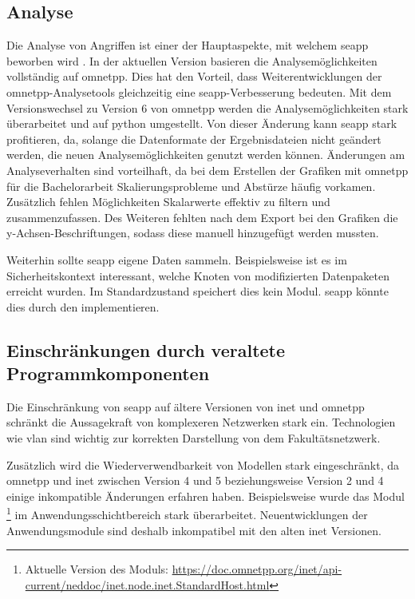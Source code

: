 \subsection{Analyse}\label{aus:Analyse}
Die Analyse von Angriffen ist einer der Hauptaspekte, mit welchem \gls{seapp} beworben wird  \cite[]{Tiloca2019}. In der aktuellen Version basieren die Analysemöglichkeiten vollständig auf \gls{omnetpp}. Dies hat den Vorteil, dass Weiterentwicklungen der \gls{omnetpp}-Analysetools gleichzeitig eine \gls{seapp}-Verbesserung bedeuten. Mit dem Versionswechsel zu Version 6 von \gls{omnetpp} werden die Analysemöglichkeiten stark überarbeitet und auf \gls{python} umgestellt. Von dieser Änderung kann \gls{seapp} stark profitieren, da, solange die Datenformate der Ergebnisdateien nicht geändert werden, die neuen Analysemöglichkeiten genutzt werden können. Änderungen am Analyseverhalten sind vorteilhaft, da bei dem Erstellen der Grafiken mit \gls{omnetpp} für die Bachelorarbeit Skalierungsprobleme und Abstürze häufig vorkamen. Zusätzlich fehlen Möglichkeiten Skalarwerte effektiv zu filtern und zusammenzufassen. Des Weiteren fehlten nach dem Export bei den Grafiken die y-Achsen-Beschriftungen, sodass diese manuell hinzugefügt werden mussten.

Weiterhin sollte \gls{seapp} eigene Daten sammeln. Beispielsweise ist es im Sicherheitskontext interessant, welche Knoten von modifizierten Datenpaketen erreicht wurden. Im Standardzustand speichert dies kein Modul. \gls{seapp} könnte dies durch den  implementieren.

\subsection{Einschränkungen durch veraltete Programmkomponenten}\label{aus:alteVersionen}
Die Einschränkung von \gls{seapp} auf ältere Versionen von \gls{inet} und \gls{omnetpp} schränkt die Aussagekraft von komplexeren Netzwerken stark ein. Technologien wie \gls{vlan} sind wichtig zur korrekten Darstellung von \zB dem Fakultätsnetzwerk.

Zusätzlich wird die Wiederverwendbarkeit von Modellen stark eingeschränkt, da \gls{omnetpp} und \gls{inet} zwischen Version 4 und 5 beziehungsweise Version 2 und 4 einige inkompatible Änderungen erfahren haben. Beispielsweise wurde das Modul \footnote{Aktuelle Version des Moduls: \url{https://doc.omnetpp.org/inet/api-current/neddoc/inet.node.inet.StandardHost.html}} im  Anwendungsschichtbereich stark überarbeitet. Neuentwicklungen der Anwendungsmodule sind deshalb inkompatibel mit den alten \gls{inet} Versionen.

